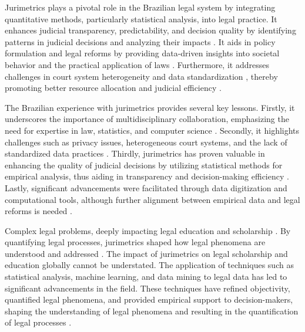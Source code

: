 Jurimetrics plays a pivotal role in the Brazilian legal system by integrating quantitative methods, particularly statistical analysis, into legal practice. It enhances judicial transparency, predictability, and decision quality by identifying patterns in judicial decisions and analyzing their impacts \cite{colombo2017pages1-1, colombo2017pages3-4, luvizotto2020pages7-8}. It aids in policy formulation and legal reforms by providing data-driven insights into societal behavior and the practical application of laws \cite{nunes2018pages12-14, nunes2018pages93-94, massuanganhe2016pages26-27}. Furthermore, it addresses challenges in court system heterogeneity and data standardization \cite{colombo2017pages1-1}, thereby promoting better resource allocation and judicial efficiency \cite{luvizotto2020pages9-10, ribeiro2021pages2-2}.

The Brazilian experience with jurimetrics provides several key lessons. Firstly, it underscores the importance of multidisciplinary collaboration, emphasizing the need for expertise in law, statistics, and computer science \cite{colombo2017, nunes2018}. Secondly, it highlights challenges such as privacy issues, heterogeneous court systems, and the lack of standardized data practices \cite{colombo2017, colombo2017}. Thirdly, jurimetrics has proven valuable in enhancing the quality of judicial decisions by utilizing statistical methods for empirical analysis, thus aiding in transparency and decision-making efficiency \cite{luvizotto2020, nunes2018, nunes2018}. Lastly, significant advancements were facilitated through data digitization and computational tools, although further alignment between empirical data and legal reforms is needed \cite{colombo2017, nunes2018}.

Complex legal problems, deeply impacting legal education and scholarship \cite{loevinger1959}. By quantifying legal processes, jurimetrics shaped how legal phenomena are understood and addressed \cite{loevinger1959}. The impact of jurimetrics on legal scholarship and education globally cannot be understated. The application of techniques such as statistical analysis, machine learning, and data mining to legal data has led to significant advancements in the field. These techniques have refined objectivity, quantified legal phenomena, and provided empirical support to decision-makers, shaping the understanding of legal phenomena and resulting in the quantification of legal processes \cite{aafedeccbdaceab,cadcdbdbbdad,faecffafcada,aeadeccffe,ccdacdfbcdaf}.

